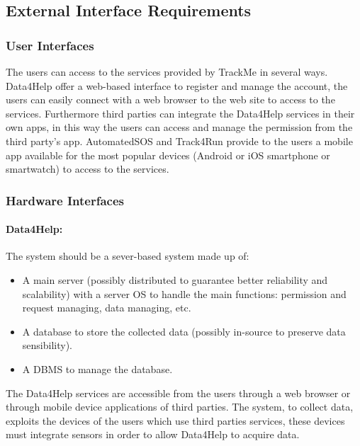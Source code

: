 \documentclass[a4paper]{article}
\begin{document}
    \subsection{External Interface Requirements}
    
    \subsubsection{User Interfaces}
    
    The users can access to the services provided by TrackMe in several ways.
    Data4Help offer a web-based interface to register and manage the account, the users can easily connect with a web browser to the web site to access to the services.
    \newline Furthermore third parties can integrate the Data4Help services in their own apps, in this way the users can access and manage the permission from the third party's app.
    AutomatedSOS and Track4Run provide to the users a mobile app available for the most popular devices (Android or iOS smartphone or smartwatch) to access to the services.
    
    
    
    \subsubsection{Hardware Interfaces}
    
    \paragraph{Data4Help:} The system should be a sever-based system made up of:
    \begin{itemize}
        \item A main server (possibly distributed to guarantee better reliability and scalability) with a server OS to handle the main functions: permission and request managing, data managing, etc.
        \item A database to store the collected data (possibly in-source to preserve data sensibility).
        \item A DBMS to manage the database.
    \end{itemize}
    The Data4Help services are accessible from the users through a web browser or through mobile device applications of third parties.
    The system, to collect data, exploits the devices of the users which use third parties services, these devices must integrate sensors in order to allow Data4Help to acquire data.
    
\end{document}
